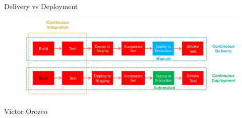 \documentclass[aspectratio=169]{beamer}
\begin{document}
\begin{frame}{Delivery vs Deployment}
\begin{figure}
	\centering
	\includegraphics[width=\linewidth]{Images/etapa2}
	\label{fig:etapa2}
\end{figure}
\end{frame}


\begin{frame}{Víctor Orozco}
    \begin{columns}[T] %


\end{columns}
\end{frame}
\end{document}

